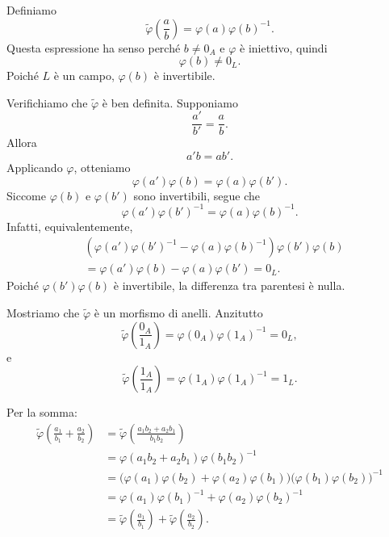\documentclass[a4paper]{article}
\begin{document}
\begin{radioactive}
\begin{snippetproof}{}
    Definiamo
    \[
        \widetilde{\varphi}\left(\frac{a}{b}\right)
        =
        \varphi(a)\varphi(b)^{-1}.
    \]
    Questa espressione ha senso perché \(b\neq 0_A\) e \(\varphi\) è iniettivo, quindi
    \[
        \varphi(b)\neq 0_L.
    \]
    Poiché \(L\) è un campo, \(\varphi(b)\) è invertibile.

    Verifichiamo che \(\widetilde{\varphi}\) è ben definita. Supponiamo
    \[
        \frac{a'}{b'}=\frac{a}{b}.
    \]
    Allora
    \[
        a'b=ab'.
    \]
    Applicando \(\varphi\), otteniamo
    \[
        \varphi(a')\varphi(b)
        =
        \varphi(a)\varphi(b').
    \]
    Siccome \(\varphi(b)\) e \(\varphi(b')\) sono invertibili, segue che
    \[
        \varphi(a')\varphi(b')^{-1}
        =
        \varphi(a)\varphi(b)^{-1}.
    \]
    Infatti, equivalentemente,
    \begin{align*}
        &
        \left(
            \varphi(a')\varphi(b')^{-1}
            -
            \varphi(a)\varphi(b)^{-1}
        \right)\varphi(b')\varphi(b) \\
        &=
        \varphi(a')\varphi(b)-\varphi(a)\varphi(b')
        =
        0_L.
    \end{align*}
    Poiché \(\varphi(b')\varphi(b)\) è invertibile, la differenza tra parentesi è nulla.

    Mostriamo che \(\widetilde{\varphi}\) è un morfismo di anelli.
    Anzitutto
    \[
        \widetilde{\varphi}\left(\frac{0_A}{1_A}\right)
        =
        \varphi(0_A)\varphi(1_A)^{-1}
        =
        0_L,
    \]
    e
    \[
        \widetilde{\varphi}\left(\frac{1_A}{1_A}\right)
        =
        \varphi(1_A)\varphi(1_A)^{-1}
        =
        1_L.
    \]

    Per la somma:
    \begin{align*}
        \widetilde{\varphi}\left(
            \frac{a_1}{b_1}+\frac{a_2}{b_2}
        \right)
        &=
        \widetilde{\varphi}\left(
            \frac{a_1b_2+a_2b_1}{b_1b_2}
        \right) \\
        &=
        \varphi(a_1b_2+a_2b_1)\varphi(b_1b_2)^{-1} \\
        &=
        \big(\varphi(a_1)\varphi(b_2)+\varphi(a_2)\varphi(b_1)\big)
        \big(\varphi(b_1)\varphi(b_2)\big)^{-1} \\
        &=
        \varphi(a_1)\varphi(b_1)^{-1}
        +
        \varphi(a_2)\varphi(b_2)^{-1} \\
        &=
        \widetilde{\varphi}\left(\frac{a_1}{b_1}\right)
        +
        \widetilde{\varphi}\left(\frac{a_2}{b_2}\right).
    \end{align*}


\end{snippetproof}
\end{radioactive}
\end{document}
